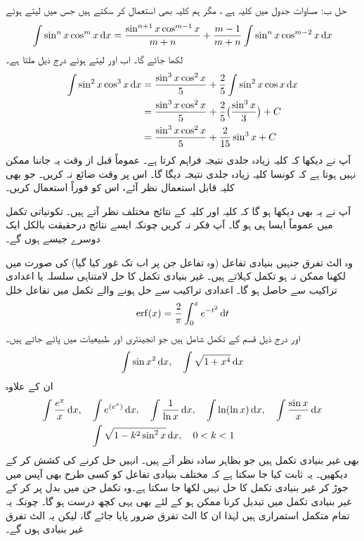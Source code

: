 حل ب:\quad
مساوات  جدول میں کلیہ  ہے ، مگر ہم کلیہ  بھی استعمال کر سکتے ہیں جس میں  لیتے ہوئے
\begin{align*}
\int \sin^nx\cos^mx\dif x=\frac{\sin^{n+1}x\cos^{m-1}x}{m+n}+\frac{m-1}{m+n}\int \sin^nx\cos^{m-2}x\dif x
\end{align*}
لکھا جائے گا۔ اب  اور  لیتے ہوئے درج ذیل ملتا ہے۔
\begin{align*}
\int\sin^2x\cos^3x\dif x&=\frac{\sin^3x\cos^2x}{5}+\frac{2}{5}\int\sin^2x\cos x\dif x\\
&=\frac{\sin^3x\cos^2x}{5}+\frac{2}{5}\big(\frac{\sin^3x}{3}\big)+C\\
&=\frac{\sin^3x\cos^2x}{5}+\frac{2}{15}\sin^3x+C
\end{align*} 
آپ نے دیکھا کہ کلیہ  زیادہ جلدی نتیجہ فراہم کرتا ہے۔ عموماً قبل از وقت یہ جاننا ممکن نہیں ہوتا ہے کہ کونسا کلیہ زیادہ جلدی نتیجہ دیگا گا۔ اس پر وقت ضائع نہ کریں۔ جو بھی کلیہ قابل استعمال نظر آئے، اس کو فوراً استعمال کریں۔

آپ نے یہ بھی دیکھا ہو گا کہ کلیہ  اور کلیہ  کے نتائج مختلف نظر آتے ہیں۔ تکونیاتی تکمل میں عموماً ایسا ہی ہو گا۔ آپ فکر نہ کریں چونکہ ایسے نتائج درحقیقت بالکل ایک دوسرے جیسے ہوں گے۔

وہ الٹ تفرق جنہیں بنیادی تفاعل (وہ تفاعل جن پر اب تک غور کیا گیا) کی صورت میں لکھنا ممکن نہ ہو  تکمل کہلاتے ہیں۔ غیر بنیادی تکمل کا حل لامتناہی سلسلہ  یا اعدادی تراکیب سے حاصل ہو گا۔ اعدادی تراکیب سے حل ہونے والے تکمل میں تفاعل خلل
\begin{align*}
\erf(x)=\frac{2}{\pi}\int_0^x e^{-t^2}\dif t
\end{align*}
اور درج ذیل قسم کے تکمل شامل ہیں جو انجینئری اور طبیعیات میں پائے جاتے ہیں۔
\begin{align*}
\int\sin x^2\dif x,\quad \int \sqrt{1+x^4}\dif x
\end{align*}
ان کے علاوہ
\begin{align*}
\int\frac{e^x}{x}\dif x,\quad &\int e^{(e^x)}\dif x,\quad \int\frac{1}{\ln x}\dif x,\quad \int \ln(\ln x)\dif x,\quad \int\frac{\sin x}{x}\dif x\\
&\int \sqrt{1-k^2\sin^2x}\dif x,\quad 0<k<1
\end{align*}
بھی غیر بنیادی تکمل ہیں جو بظاہر سادہ نظر آتے ہیں۔ انہیں حل کرنے کی کشش کر کے دیکھیں۔ یہ ثابت کیا جا سکتا ہے کہ مختلف بنیادی تفاعل کو کسی طرح بھی آپس میں جوڑ کر غیر بنیادی تکمل کا حل نہیں لکھا جا سکتا ہے۔وہ تکمل جن میں بدل پر کر کے غیر بنیادی تکمل میں تبدیل کرنا ممکن ہو کے لئے بھی یہی کچھ درست ہو گا۔ چونکہ یہ تمام متکمل استمراری ہیں لہٰذا ان کا الٹ تفرق ضرور پایا جائے گا، لیکن یہ الٹ تفرق غیر بنیادی ہوں گے۔ 

